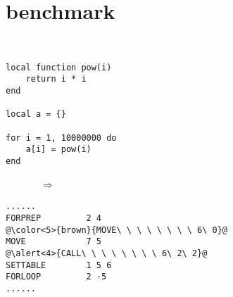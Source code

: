 \section{benchmark}
\begin{frame}[fragile]
\frametitlesec
\begin{minipage}{.05\textwidth}
	\ 
\end{minipage}
\begin{minipage}[t]{.3\textwidth}
	\scriptsize
	\begin{lstlisting}[language={[5.3]lua}]
local function pow(i)
	return i * i
end

local a = {}

for i = 1, 10000000 do
	a[i] = pow(i)
end
	\end{lstlisting}
	\begin{minipage}[t]{1.2\textwidth}
			\vspace{3\zw}
	\end{minipage}
\end{minipage}
\begin{minipage}[t]{.2\textwidth}
	\pause
	\vspace{3\zw}
	\ \ \ \ \ \ \ $\Rightarrow$

	\vspace{6\zw}
\end{minipage}
\begin{minipage}[t]{.3\textwidth}
	\bgroup
	\scriptsize
	\begin{lstlisting}[style=snippet,escapechar={@}]
......
FORPREP         2 4    
@\color<5>{brown}{MOVE\ \ \ \ \ \ \ \ 6\ 0}@
MOVE            7 5
@\alert<4>{CALL\ \ \ \ \ \ \ \ 6\ 2\ 2}@
SETTABLE        1 5 6
FORLOOP         2 -5   
......
	\end{lstlisting}
	\egroup


\end{minipage}
\end{frame}
